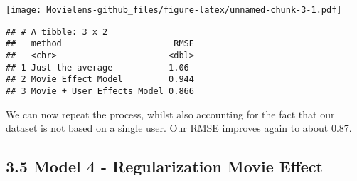 \documentclass[]{article}
\newenvironment{Shaded}{\begin{snugshade}}{\end{snugshade}}
\newcommand{\DataTypeTok}[1]{\textcolor[rgb]{0.13,0.29,0.53}{#1}}
\newcommand{\DecValTok}[1]{\textcolor[rgb]{0.00,0.00,0.81}{#1}}
\newcommand{\KeywordTok}[1]{\textcolor[rgb]{0.13,0.29,0.53}{\textbf{#1}}}
\newcommand{\NormalTok}[1]{#1}
\newcommand{\OperatorTok}[1]{\textcolor[rgb]{0.81,0.36,0.00}{\textbf{#1}}}
\newcommand{\StringTok}[1]{\textcolor[rgb]{0.31,0.60,0.02}{#1}}
\begin{document}
\texttt{[image: Movielens-github\_files/figure-latex/unnamed-chunk-3-1.pdf]}

\begin{Shaded}
\end{Shaded}

\begin{verbatim}
## # A tibble: 3 x 2
##   method                      RMSE
##   <chr>                      <dbl>
## 1 Just the average           1.06 
## 2 Movie Effect Model         0.944
## 3 Movie + User Effects Model 0.866
\end{verbatim}

We can now repeat the process, whilst also accounting for the fact that
our dataset is not based on a single user. Our RMSE improves again to
about 0.87.

\hypertarget{model-4---regularization-movie-effect-1}{%
\subsection{3.5 Model 4 - Regularization Movie
Effect}\label{model-4---regularization-movie-effect-1}}
\end{document}
